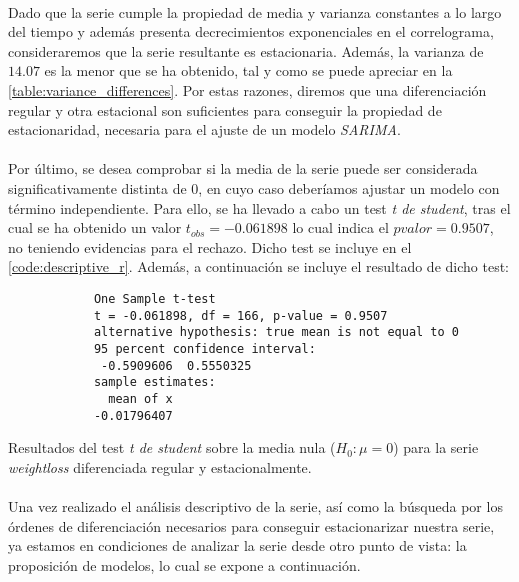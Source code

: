 \documentclass[a4paper, spanish]{article}
\begin{document}
        \paragraph{}
        Dado que la serie cumple la propiedad de media y varianza constantes a lo largo del tiempo y además presenta decrecimientos exponenciales en el correlograma, consideraremos que la serie resultante es estacionaria. Además, la varianza de $14.07$ es la menor que se ha obtenido, tal y como se puede apreciar en la \autoref{table:variance_differences}. Por estas razones, diremos que una diferenciación regular y otra estacional son suficientes para conseguir la propiedad de estacionaridad, necesaria para el ajuste de un modelo \emph{SARIMA}.

        \paragraph{}
        Por último, se desea comprobar si la media de la serie puede ser considerada significativamente distinta de $0$, en cuyo caso deberíamos ajustar un modelo con término independiente. Para ello, se ha llevado a cabo un test \emph{t de student}, tras el cual se ha obtenido un valor $t_{obs} = -0.061898$ lo cual indica el $pvalor = 0.9507$, no teniendo evidencias para el rechazo. Dicho test se incluye en el \autoref{code:descriptive_r}. Además, a continuación se incluye el resultado de dicho test:

        \begin{table}
          \begin{Verbatim}
            One Sample t-test
            t = -0.061898, df = 166, p-value = 0.9507
            alternative hypothesis: true mean is not equal to 0
            95 percent confidence interval:
             -0.5909606  0.5550325
            sample estimates:
              mean of x
            -0.01796407
          \end{Verbatim}
          \caption{Resultados del test \emph{t de student} sobre la media nula ($H_0: \mu = 0$) para la serie \emph{weightloss} diferenciada regular y estacionalmente.}
          \label{result:zero_mean_test}
        \end{table}

    \paragraph{}
    Una vez realizado el análisis descriptivo de la serie, así como la búsqueda por los órdenes de diferenciación necesarios para conseguir estacionarizar nuestra serie, ya estamos en condiciones de analizar la serie desde otro punto de vista: la proposición de modelos, lo cual se expone a continuación.
\end{document}
